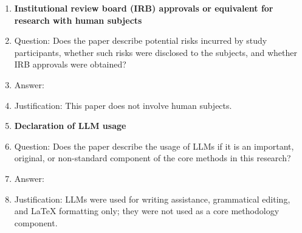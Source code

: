 \begin{enumerate}
\item {\bf Institutional review board (IRB) approvals or equivalent for research with human subjects}
    \item[] Question: Does the paper describe potential risks incurred by study participants, whether such risks were disclosed to the subjects, and whether IRB approvals were obtained?
    \item[] Answer: \answerNA{}
    \item[] Justification: This paper does not involve human subjects.

\item {\bf Declaration of LLM usage}
    \item[] Question: Does the paper describe the usage of LLMs if it is an important, original, or non-standard component of the core methods in this research?
    \item[] Answer: \answerYes{}
    \item[] Justification: LLMs were used for writing assistance, grammatical editing, and LaTeX formatting only; they were not used as a core methodology component.

\end{enumerate}
